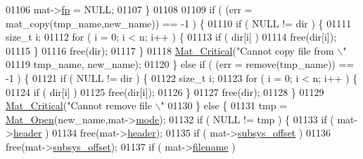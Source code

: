 \begin{DoxyCode}
{{{{{{{{{{{{{{{{{{{{{{{{{{01106                     mat->\hyperlink{struct__mat__t_a85f562e407ca9ad4d2a6e14f839432b7}{fp} = NULL;
01107                 \}
01108 
01109                 \textcolor{keywordflow}{if} ( (err = mat\_copy(tmp\_name,new\_name)) == -1 ) \{
01110                     \textcolor{keywordflow}{if} ( NULL != dir ) \{
01111                         \textcolor{keywordtype}{size\_t} i;
01112                         \textcolor{keywordflow}{for} ( i = 0; i < n; i++ ) \{
01113                             \textcolor{keywordflow}{if} ( dir[i] )
01114                                 free(dir[i]);
01115                         \}
01116                         free(dir);
01117                     \}
01118                     \hyperlink{group__mat__util_gaf51f2bfbb5580f575e4dd79757e2b80c}{Mat\_Critical}(\textcolor{stringliteral}{"Cannot copy file from \(\backslash\)"%
01119                         tmp\_name, new\_name);
01120                 \} \textcolor{keywordflow}{else} \textcolor{keywordflow}{if} ( (err = \textcolor{keyword}{remove}(tmp\_name)) == -1 ) \{
01121                     \textcolor{keywordflow}{if} ( NULL != dir ) \{
01122                         \textcolor{keywordtype}{size\_t} i;
01123                         \textcolor{keywordflow}{for} ( i = 0; i < n; i++ ) \{
01124                             \textcolor{keywordflow}{if} ( dir[i] )
01125                                 free(dir[i]);
01126                         \}
01127                         free(dir);
01128                     \}
01129                     \hyperlink{group__mat__util_gaf51f2bfbb5580f575e4dd79757e2b80c}{Mat\_Critical}(\textcolor{stringliteral}{"Cannot remove file \(\backslash\)"%
01130                 \} \textcolor{keywordflow}{else} \{
01131                     tmp = \hyperlink{group___m_a_t_gafbfedb5636a99f0ef867520c47f77d18}{Mat\_Open}(new\_name,mat->\hyperlink{struct__mat__t_aa43288b63b8edb7cadf0b79e2d1df2ee}{mode});
01132                     \textcolor{keywordflow}{if} ( NULL != tmp ) \{
01133                         \textcolor{keywordflow}{if} ( mat->\hyperlink{struct__mat__t_a5ed5d0e4e3c4d76b626a8a1772d579c4}{header} )
01134                             free(mat->\hyperlink{struct__mat__t_a5ed5d0e4e3c4d76b626a8a1772d579c4}{header});
01135                         \textcolor{keywordflow}{if} ( mat->\hyperlink{struct__mat__t_a19317c01209959d755d69311960d3eec}{subsys\_offset} )
01136                             free(mat->\hyperlink{struct__mat__t_a19317c01209959d755d69311960d3eec}{subsys\_offset});
01137                         \textcolor{keywordflow}{if} ( mat->\hyperlink{struct__mat__t_a340b191598135edd03b6dec847f0b1b1}{filename} )
}}}}}}}}}}}}}}}}}}}}}}}}}}}}
\end{DoxyCode}
